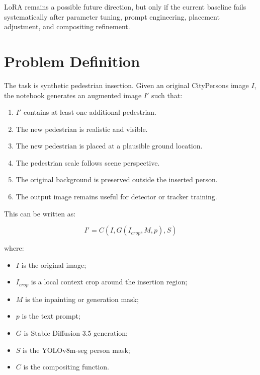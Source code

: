 \documentclass[12pt,a4paper]{article}
\begin{document}
LoRA remains a possible future direction, but only if the current baseline fails
systematically after parameter tuning, prompt engineering, placement adjustment,
and compositing refinement.

\section{Problem Definition}

The task is synthetic pedestrian insertion. Given an original CityPersons image
$I$, the notebook generates an augmented image $I'$ such that:

\begin{enumerate}
    \item $I'$ contains at least one additional pedestrian.
    \item The new pedestrian is realistic and visible.
    \item The new pedestrian is placed at a plausible ground location.
    \item The pedestrian scale follows scene perspective.
    \item The original background is preserved outside the inserted person.
    \item The output image remains useful for detector or tracker training.
\end{enumerate}

This can be written as:

\begin{equation}
I' = C(I, G(I_{crop}, M, p), S)
\end{equation}

where:

\begin{itemize}
    \item $I$ is the original image;
    \item $I_{crop}$ is a local context crop around the insertion region;
    \item $M$ is the inpainting or generation mask;
    \item $p$ is the text prompt;
    \item $G$ is Stable Diffusion 3.5 generation;
    \item $S$ is the YOLOv8m-seg person mask;
    \item $C$ is the compositing function.
\end{itemize}
\end{document}
